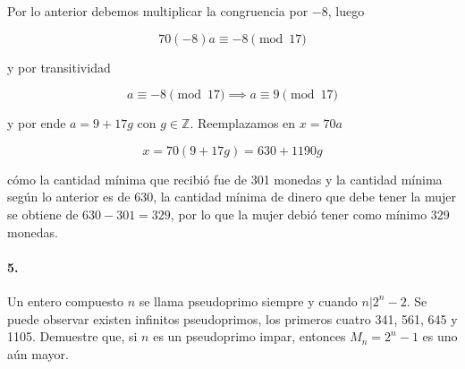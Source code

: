 \documentclass{article}
\begin{document}
	Por lo anterior debemos multiplicar la congruencia por $-8$, luego
	
	$$70(-8)a \equiv -8 \pmod{17}$$
	
	y por transitividad
	
	$$a \equiv -8 \pmod{17} \implies a \equiv 9 \pmod{17}$$
	
	y por ende $a = 9 + 17g$ con $g \in \mathbb{Z}$. Reemplazamos en $x = 70a$
	
	$$x = 70(9 + 17g) = 630 + 1190g$$
	
	cómo la cantidad mínima que recibió  fue de 301 monedas y la cantidad mínima según lo anterior es de 630, la cantidad mínima de dinero que debe tener la mujer se obtiene de $630 - 301 = 329$, por lo que la mujer debió tener como mínimo 329 monedas.
	
	\paragraph{5.} Un entero compuesto $n$ se llama pseudoprimo siempre y cuando $n|2^n - 2$. Se puede observar existen infinitos pseudoprimos, los primeros cuatro 341, 561, 645 y 1105. Demuestre que, si $n$ es un pseudoprimo impar, entonces $M_n = 2^n - 1$ es uno aún mayor.
	
\end{document}
